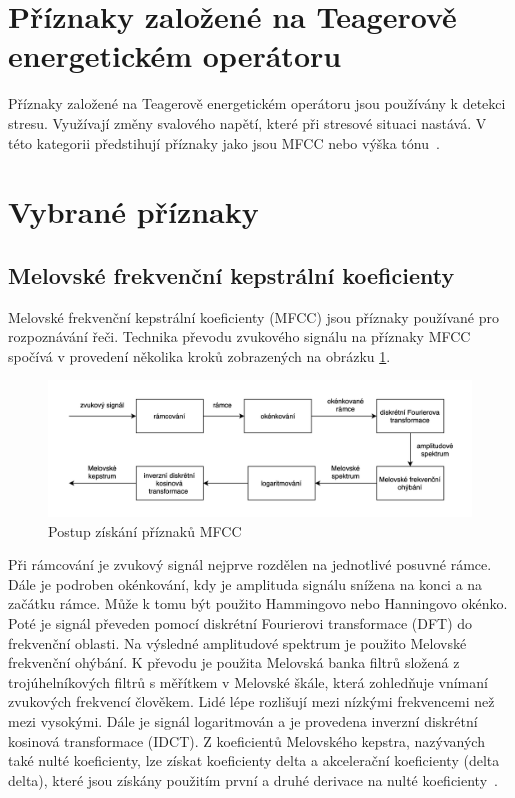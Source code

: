\documentclass[FM,BP]{tulthesis}
\begin{document}
\section{Příznaky založené na Teagerově energetickém operátoru}  %
Příznaky založené na Teagerově energetickém operátoru jsou používány k detekci stresu. Využívají změny svalového napětí, které při stresové situaci nastává. V této kategorii předstihují příznaky jako jsou MFCC nebo výška tónu~\cite{DBLP:journals/speech/AkcayO20}.

\section{Vybrané příznaky}
\subsection{Melovské frekvenční kepstrální koeficienty} %
Melovské frekvenční kepstrální koeficienty (MFCC) jsou příznaky používané pro rozpoznávání řeči. Technika převodu zvukového signálu na příznaky MFCC spočívá v provedení několika kroků zobrazených na obrázku \ref{fig:mfcc_pipeline}. 

\begin{figure}[htbp]
\centerline{\includegraphics[width=\textwidth,height=\textheight,keepaspectratio]{mfcc_pipeline.png}}
\caption{Postup získání příznaků MFCC}
\label{fig:mfcc_pipeline}
\end{figure}
\FloatBarrier

Při rámcování je zvukový signál nejprve rozdělen na jednotlivé posuvné rámce. Dále je podroben okénkování, kdy je amplituda signálu snížena na konci a na začátku rámce. Může k tomu být použito Hammingovo nebo Hanningovo okénko. Poté je signál převeden pomocí diskrétní Fourierovi transformace (DFT) do frekvenční oblasti. Na výsledné amplitudové spektrum je použito Melovské frekvenční ohýbání. K převodu je použita Melovská banka filtrů složená z trojúhelníkových filtrů s měřítkem v Melovské škále, která zohledňuje vnímaní zvukových frekvencí člověkem. Lidé lépe rozlišují mezi nízkými frekvencemi než mezi vysokými. Dále je signál logaritmován a je provedena inverzní diskrétní kosinová transformace (IDCT). Z koeficientů Melovského kepstra, nazývaných také nulté koeficienty, lze získat koeficienty delta a akcelerační koeficienty (delta delta), které jsou získány použitím první a druhé derivace na nulté koeficienty~\cite{mfcc}.
\end{document}
